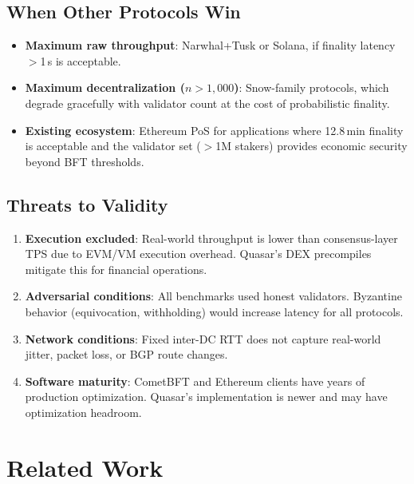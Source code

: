 \documentclass[11pt]{article}
\begin{document}
\subsection{When Other Protocols Win}

\begin{itemize}
\item \textbf{Maximum raw throughput}: Narwhal+Tusk or Solana, if finality latency
      $>$1\,s is acceptable.
\item \textbf{Maximum decentralization ($n > 1{,}000$)}: Snow-family protocols, which
      degrade gracefully with validator count at the cost of probabilistic finality.
\item \textbf{Existing ecosystem}: Ethereum PoS for applications where 12.8\,min
      finality is acceptable and the validator set ($>$1M stakers) provides economic
      security beyond BFT thresholds.
\end{itemize}

\subsection{Threats to Validity}

\begin{enumerate}
\item \textbf{Execution excluded}: Real-world throughput is lower than consensus-layer
      TPS due to EVM/VM execution overhead. Quasar's DEX precompiles mitigate this
      for financial operations.
\item \textbf{Adversarial conditions}: All benchmarks used honest validators. Byzantine
      behavior (equivocation, withholding) would increase latency for all protocols.
\item \textbf{Network conditions}: Fixed inter-DC RTT does not capture real-world jitter,
      packet loss, or BGP route changes.
\item \textbf{Software maturity}: CometBFT and Ethereum clients have years of production
      optimization. Quasar's implementation is newer and may have optimization
      headroom.
\end{enumerate}

\section{Related Work}
\label{sec:related}
\end{document}
